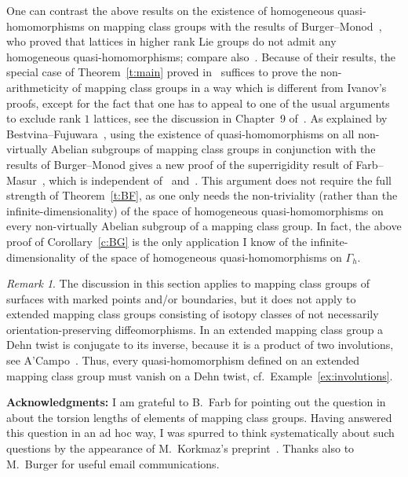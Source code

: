 \documentclass[12pt]{amsart}
\theoremstyle{remark}
\newtheorem{rem}[thm]{Remark}
\theoremstyle{definition}
\begin{document}
One can contrast the above results on the existence of homogeneous 
quasi-homomorphisms on mapping class groups with the results of 
Burger--Monod~\cite{BM}, who proved that lattices in higher rank Lie 
groups do not admit any homogeneous quasi-homomorphisms; compare 
also~\cite{Monod}. Because of their results, the special case of 
Theorem~\ref{t:main} proved in~\cite{EK} suffices to prove the 
non-arithmeticity of mapping class groups in a way which is different 
from Ivanov's proofs, except for the fact that one has to appeal to 
one of the usual arguments to exclude rank $1$ lattices, see the discussion 
in Chapter~9 of~\cite{I}. As explained by Bestvina--Fujuwara~\cite{BF},
using the existence of quasi-homomorphisms on all non-virtually Abelian 
subgroups of mapping class groups in conjunction with the results of 
Burger--Monod gives a new proof of the superrigidity result of 
Farb--Masur~\cite{FM}, which is independent of~\cite{FM} and~\cite{KM}. 
This argument does not require the full strength of Theorem~\ref{t:BF}, 
as one only needs the non-triviality (rather than the infinite-dimensionality) 
of the space of homogeneous quasi-homomorphisms on every non-virtually 
Abelian subgroup of a mapping class group. In fact, the above proof of 
Corollary~\ref{c:BG} is the only application I know of the 
infinite-dimensionality of the space of homogeneous quasi-homomorphisms 
on $\Gamma_{h}$.

\begin{rem}
    The discussion in this section applies to mapping class groups of 
    surfaces with marked points and/or boundaries, but it does not 
    apply to extended mapping class groups consisting of isotopy 
    classes of not necessarily orientation-preserving diffeomorphisms. 
    In an extended mapping class group a Dehn twist is conjugate to 
    its inverse, because it is a product of two involutions, see 
    A'Campo~\cite{NAC}. Thus, every quasi-homomorphism defined on an 
    extended mapping class group must vanish on a Dehn twist, 
    cf.~Example~\ref{ex:involutions}.
    \end{rem}

\medskip\noindent
{\bf Acknowledgments:} I am grateful to B.~Farb for pointing out the 
question in~\cite{BrFa} about the torsion lengths of elements of mapping 
class groups. Having answered this question in an ad hoc way, I was 
spurred to think systematically about such questions by the 
appearance of M.~Korkmaz's preprint~\cite{Kork2}. Thanks also to 
M.~Burger for useful email communications.
\end{document}

